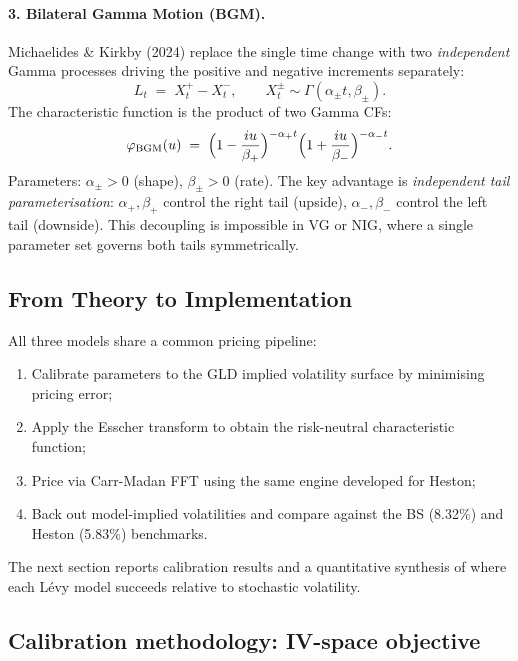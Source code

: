\documentclass[12pt, a4paper]{article}
\begin{document}
\paragraph{3. Bilateral Gamma Motion (BGM).}
Michaelides \& Kirkby (2024) replace the single time change with two \emph{independent} Gamma processes driving the positive and negative increments separately:
\begin{equation}
L_t \;=\; X^+_t - X^-_t, \qquad X^\pm_t \sim \Gamma(\alpha_\pm t, \beta_\pm).
\end{equation}
The characteristic function is the product of two Gamma CFs:
\begin{equation}
\varphi_{\text{BGM}}(u) \;=\;
\Bigl(1 - \frac{iu}{\beta_+}\Bigr)^{-\alpha_+ t}
\Bigl(1 + \frac{iu}{\beta_-}\Bigr)^{-\alpha_- t}.
\end{equation}
Parameters: $\alpha_\pm > 0$ (shape), $\beta_\pm > 0$ (rate). The key advantage is \emph{independent tail parameterisation}: $\alpha_+, \beta_+$ control the right tail (upside), $\alpha_-, \beta_-$ control the left tail (downside). This decoupling is impossible in VG or NIG, where a single parameter set governs both tails symmetrically.

\subsection{From Theory to Implementation}
\label{subsec:gen2-implementation}

All three models share a common pricing pipeline:
\begin{enumerate}
\item Calibrate parameters to the GLD implied volatility surface by minimising pricing error;
\item Apply the Esscher transform to obtain the risk-neutral characteristic function;
\item Price via Carr-Madan FFT using the same engine developed for Heston;
\item Back out model-implied volatilities and compare against the BS (8.32\%) and Heston (5.83\%) benchmarks.
\end{enumerate}

The next section reports calibration results and a quantitative synthesis of where each L\'evy model succeeds relative to stochastic volatility.

\subsection{Calibration methodology: IV-space objective}
\end{document}
